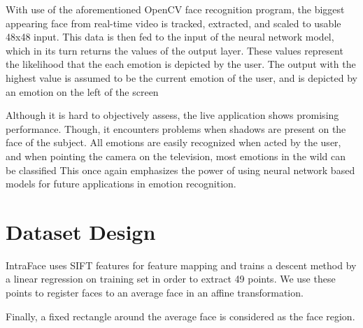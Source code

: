 With use of the aforementioned OpenCV face recognition program, the biggest appearing face from real-time video is tracked, extracted, and scaled to usable 48x48 input. This data is then fed to the input of the neural network model, which in its turn returns the values of the output layer. These values represent the likelihood that the each emotion is depicted by the user. The output with the highest value is assumed to be the current emotion of the user, and is depicted by an emotion on the left of the screen

Although it is hard to objectively assess, the live application shows promising performance. Though, it encounters problems when shadows are present on the face of the subject. All emotions are easily recognized when acted by the user, and when pointing the camera on the television, most emotions in the wild can be classified This once again emphasizes the power of using neural network based models for future applications in emotion recognition.

\section{Dataset Design}
IntraFace uses SIFT features for feature mapping and trains a descent method by a linear regression on training set in order to extract 49 points. We use these points to register faces to an average face in an affine transformation.

Finally, a fixed rectangle around the average face is considered as the face region.

